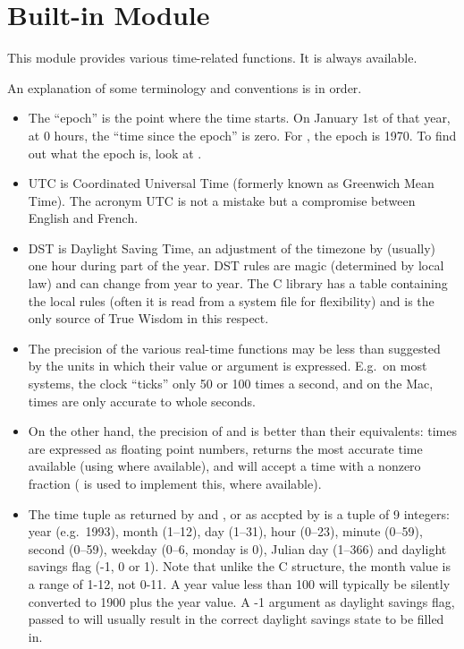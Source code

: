 \section{Built-in Module }
\label{module-time}

This module provides various time-related functions.
It is always available.

An explanation of some terminology and conventions is in order.

\begin{itemize}

\item
The ``epoch'' is the point where the time starts.  On January 1st of that
year, at 0 hours, the ``time since the epoch'' is zero.  For \UNIX{}, the
epoch is 1970.  To find out what the epoch is, look at .

\item
UTC is Coordinated Universal Time (formerly known as Greenwich Mean
Time).  The acronym UTC is not a mistake but a compromise between
English and French.

\item
DST is Daylight Saving Time, an adjustment of the timezone by
(usually) one hour during part of the year.  DST rules are magic
(determined by local law) and can change from year to year.  The C
library has a table containing the local rules (often it is read from
a system file for flexibility) and is the only source of True Wisdom
in this respect.

\item
The precision of the various real-time functions may be less than
suggested by the units in which their value or argument is expressed.
E.g.\ on most \UNIX{} systems, the clock ``ticks'' only 50 or 100 times a
second, and on the Mac, times are only accurate to whole seconds.

\item
On the other hand, the precision of  and 
is better than their \UNIX{} equivalents: times are expressed as floating
point numbers,  returns the most accurate time available
(using \UNIX{}  where available), and 
will accept a time with a nonzero fraction (\UNIX{}  is
used to implement this, where available).

\item
The time tuple as returned by  and ,
or as accpted by  is a tuple of 9
integers: year (e.g.\ 1993), month (1--12), day (1--31), hour
(0--23), minute (0--59), second (0--59), weekday (0--6, monday is 0),
Julian day (1--366) and daylight savings flag (-1, 0  or 1).
Note that unlike the C structure, the month value is a range of 1-12, not
0-11.  A year value less than 100 will typically be silently converted to
1900 plus the year value.  A -1 argument as daylight savings flag, passed to
 will usually result in the correct daylight savings
state to be filled in.


\end{itemize}

